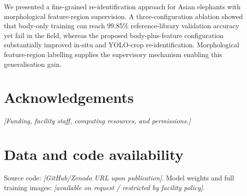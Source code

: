 \documentclass[preprint,12pt,3p,times]{elsarticle}
\begin{document}
We presented a fine-grained re-identification approach for Asian elephants with morphological feature-region supervision. A three-configuration ablation showed that body-only training can reach 99.85\% reference-library validation accuracy yet fail in the field, whereas the proposed body-plus-feature configuration substantially improved in-situ and YOLO-crop re-identification. Morphological feature-region labelling supplies the supervisory mechanism enabling this generalisation gain.

\section*{Acknowledgements}

\textit{[Funding, facility staff, computing resources, and permissions.]}

\section*{Data and code availability}

Source code: \textit{[GitHub/Zenodo URL upon publication]}. Model weights and full training images: \textit{[available on request / restricted by facility policy]}.



\end{document}
